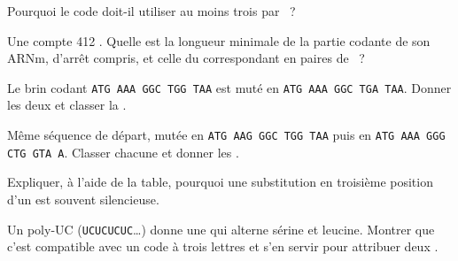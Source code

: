 \begin{exercise}[$\star$]\label{exo:g11:gene-expression:5}
Pourquoi le code doit-il utiliser au moins trois  par ~?
\end{exercise}

\begin{exercise}[$\star\star$]\label{exo:g11:gene-expression:6}
Une  compte 412 . Quelle est la longueur minimale
de la partie codante de son ARNm,  d'arrêt compris, et celle du
 correspondant en paires de ~?
\end{exercise}

\begin{exercise}[$\star\star$]\label{exo:g11:gene-expression:7}
Le brin codant \texttt{ATG AAA GGC TGG TAA} est muté en
\texttt{ATG AAA GGC TGA TAA}. Donner les deux  et classer la
.
\end{exercise}

\begin{exercise}[$\star\star$]\label{exo:g11:gene-expression:8}
Même séquence de départ, mutée en \texttt{ATG AAG GGC TGG TAA} puis en
\texttt{ATG AAA GGG CTG GTA A}. Classer chacune et donner les .
\end{exercise}

\begin{exercise}[$\star\star$]\label{exo:g11:gene-expression:9}
Expliquer, à l'aide de la table, pourquoi une substitution en troisième
position d'un  est souvent silencieuse.
\end{exercise}

\begin{exercise}[$\star\star$]\label{exo:g11:gene-expression:10}
Un  poly-UC (\texttt{UCUCUCUC}\dots) donne une  qui alterne
sérine et leucine. Montrer que c'est compatible avec un code à trois
lettres et s'en servir pour attribuer deux .
\end{exercise}

